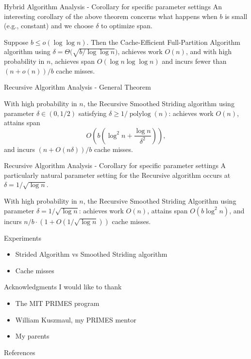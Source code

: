 \documentclass[x11names, svgnames, rgb]{beamer}
\newcommand{\polylog}{\operatorname{polylog}}
\begin{document}
\begin{frame}[t]{Hybrid Algorithm Analysis - Corollary for specific parameter settings}
An interesting corollary of the above theorem concerns what happens when $b$ is small (e.g., constant) and we choose $\delta$ to optimize span. 
\begin{corollary}
Suppose $b \le o(\log \log n)$. Then the Cache-Efficient Full-Partition Algorithm algorithm using $\delta = \Theta\big(\sqrt{b/\log\log n}\big)$, achieves work $O(n)$, and with high probability in $n$, achieves span $O(\log n \log\log n)$ and incurs fewer than $(n+o(n))/b$ cache misses.
\end{corollary}
\end{frame}


\begin{frame}[t]{Recursive Algorithm Analysis - General Theorem}
	\begin{theorem}
	With high probability in $n$, the Recursive Smoothed Striding
        algorithm using parameter $\delta \in(0,1/2)$ satisfying
        $\delta \ge 1 / \polylog(n)$: achieves work $O(n)$, attains span
	$$O\left(b\left(\log^2 n + \frac{\log n}{\delta^2}\right)\right),$$
	and incurs $(n+O(n \delta))/b$ cache misses. 
	\end{theorem}
\end{frame}

\begin{frame}[t]{Recursive Algorithm Analysis - Corollary for specific parameter settings}
A particularly natural parameter setting for the Recursive algorithm occurs at $\delta = 1 / \sqrt{\log n}$.
\begin{corollary}
	With high probability in $n$, the Recursive Smoothed Striding Algorithm using parameter $\delta=1/\sqrt{\log n}$:
  achieves work $O(n)$, attains span $O(b\log^2 n)$, and incurs $n/b \cdot (1 + O(1 / \sqrt{\log n}))$ cache misses. 
\end{corollary}
\end{frame}

\begin{frame}[t]{Experiments}
	\begin{itemize}
		\item Strided Algorithm vs Smoothed Striding algorithm
		\item Cache misses 
	\end{itemize}
\end{frame}

\begin{frame}[t]{Acknowledgments}
I would like to thank
\begin{itemize}
	\item {The MIT PRIMES program}
	\item {William Kuszmaul, my PRIMES mentor}
	\item {My parents}
\end{itemize}
\end{frame}

\begin{frame}[t]{References}
	 
	
\end{frame}
\end{document}
